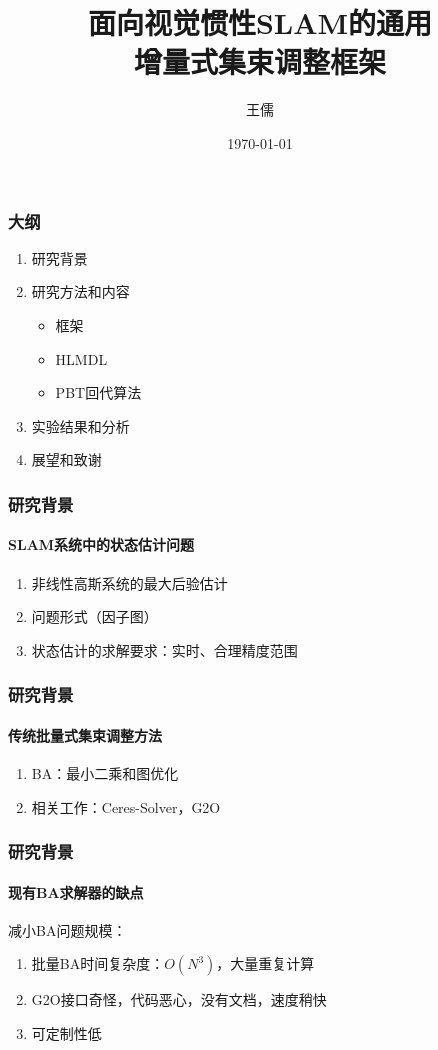 \documentclass{beamer}
\title{面向视觉惯性SLAM的通用\\增量式集束调整框架}
\author{王儒}
\institute{浙江大学CAD\&CG国家重点实验室}
\date{\today}
\begin{document}
\frame{\titlepage}

\begin{frame}
    \frametitle{大纲}
    \begin{enumerate}
        \item 研究背景
        \item 研究方法和内容
            \begin{itemize}
                \item 框架
                \item HLMDL
                \item PBT回代算法
            \end{itemize}
        \item 实验结果和分析
        \item 展望和致谢
    \end{enumerate}
\end{frame}

\begin{frame}
    \frametitle{研究背景}
    \framesubtitle{SLAM系统中的状态估计问题}
    \begin{enumerate}
        \item 非线性高斯系统的最大后验估计
        \item 问题形式（因子图）
        \item 状态估计的求解要求：实时、合理精度范围
    \end{enumerate}
\end{frame}

\begin{frame}
    \frametitle{研究背景}
    \framesubtitle{传统批量式集束调整方法}
    \begin{enumerate}
        \item BA：最小二乘和图优化
        \item 相关工作：Ceres-Solver，G2O
    \end{enumerate}
\end{frame}

\begin{frame}
    \frametitle{研究背景}
    \framesubtitle{现有BA求解器的缺点}

    减小BA问题规模：
    \begin{enumerate}
        \item 批量BA时间复杂度：$O(N^3)$，大量重复计算
        \item G2O接口奇怪，代码恶心，没有文档，速度稍快
        \item 可定制性低
    \end{enumerate}
\end{frame}
\end{document}
